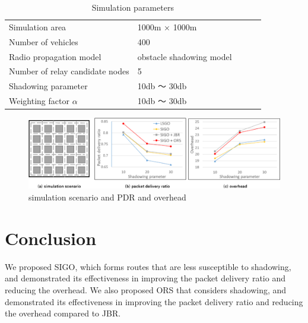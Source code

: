 \documentclass{comex}
\begin{document}
 
\begin{table}[!ht]
\begin{center}
\caption{Simulation parameters}
\label{tab:parameter}
\begin{tabular}{|l|l|lll}
\cline{1-2}
Simulation area    & 1000m × 1000m   &  &  &  \\ \cline{1-2}
Number of vehicles & 400      &  &  &  \\ \cline{1-2}
Radio propagation model    & obstacle shadowing model\cite{obstacle}&  &  &  \\ \cline{1-2}
Number of relay candidate nodes  & 5       &  &  \\ \cline{1-2}
Shadowing parameter   & 10db ～ 30db      &  &  &  \\ \cline{1-2}
Weighting factor $\alpha$  & 10db ～ 30db      &  &  &  \\ \cline{1-2}
\end{tabular}
\end{center}
\end{table}

\begin{figure}[!ht]
\centering
\includegraphics[width=120mm]{figures/evaluation.eps}
\caption{simulation scenario and PDR and overhead }
\label{fig:evaluation}
\end{figure}

\section{Conclusion}
We proposed SIGO, which forms routes that are less susceptible to shadowing, and demonstrated its effectiveness in improving the packet delivery ratio and reducing the overhead. 
We also proposed ORS that considers shadowing, and demonstrated  its effectiveness in improving the packet delivery ratio and reducing the overhead compared to JBR.




\end{document}
